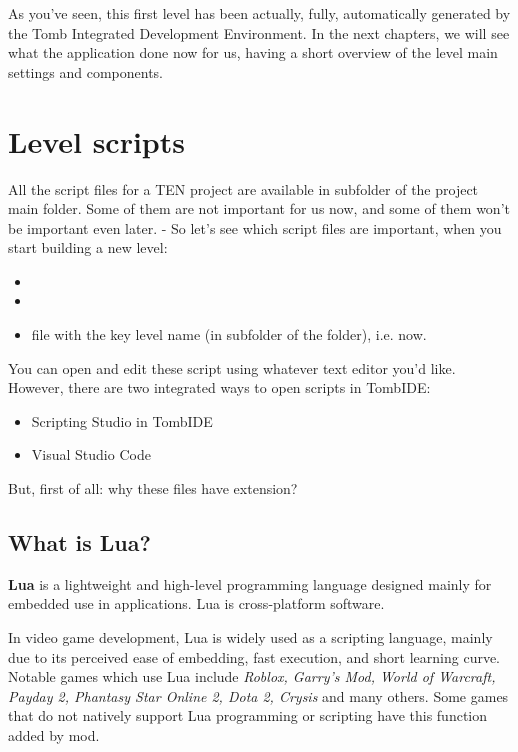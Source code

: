 \par As you've seen, this first level has been actually, fully, automatically generated by the Tomb Integrated Development Environment. In the next chapters, we will see what the application done now for us, having a short overview of the level main settings and components.



\chapter{Level scripts}
All the script files for a TEN project are available in  subfolder of the project main folder.
Some of them are not important for us now, and some of them won't be important even later. - So let's see which script files are important, when you start building a new level:
\begin{itemize}
    \item {}
    \item {}
    \item {} file with the key level name (in  subfolder of the  folder), i.e.  now.
\end{itemize}

You can open and edit these script using whatever text editor you'd like. However, there are two integrated ways to open scripts in TombIDE:
\begin{itemize}
    \item Scripting Studio in TombIDE
    \item Visual Studio Code
\end{itemize}

But, first of all: why these files have  extension?

\section{What is Lua?}

\textbf{Lua} is a lightweight and high-level programming language designed mainly for embedded use in applications. Lua is cross-platform software.

\par In video game development, Lua is widely used as a scripting language, mainly due to its perceived ease of embedding, fast execution, and short learning curve. Notable games which use Lua include \emph{Roblox, Garry's Mod, World of Warcraft, Payday 2, Phantasy Star Online 2, Dota 2, Crysis} and many others. Some games that do not natively support Lua programming or scripting have this function added by mod.

